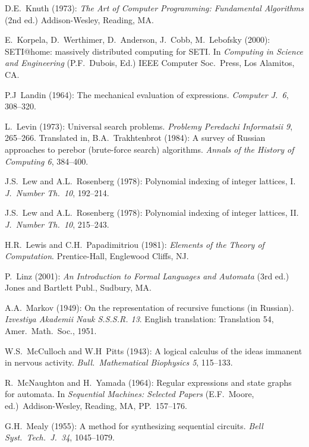\begin{thebibliography}{999}
D.E.~Knuth (1973): {\it The Art of Computer Programming: Fundamental
Algorithms} (2nd ed.)  Addison-Wesley, Reading, MA.

E.~Korpela, D.~Werthimer, D.~Anderson, J.~Cobb, M.~Lebofsky (2000):
SETI@home: massively distributed computing for SETI.  In {\it
Computing in Science and Engineering} (P.F.~Dubois, Ed.)  IEEE
Computer Soc.~Press, Los Alamitos, CA.


P.J~Landin (1964): The mechanical evaluation of expressions.  {\it
  Computer J.~6}, 308--320.

L.~Levin (1973): Universal search problems.  {\it Problemy Peredachi
Informatsii 9}, 265--266.  Translated in, B.A.~Trakhtenbrot (1984): A
survey of Russian approaches to perebor (brute-force search)
algorithms.  {\it Annals of the History of Computing 6}, 384--400.

J.S.~Lew and A.L.~Rosenberg (1978): Polynomial indexing of integer
lattices, I.  {\it J.~Number Th.~10}, 192--214.
 
J.S.~Lew and A.L.~Rosenberg (1978): Polynomial indexing of integer
lattices, II.  {\it J.~Number Th.~10}, 215--243.

H.R.~Lewis and C.H.~Papadimitriou (1981):
{\it Elements of the Theory of Computation}.
Prentice-Hall, Englewood Cliffs, NJ.

P.~Linz (2001): {\it An Introduction to Formal Languages and Automata}
(3rd ed.)  Jones and Bartlett Publ., Sudbury, MA.


A.A.~Markov (1949): On the representation of recursive functions (in
Russian).  {\it Izvestiya Akademii Nauk S.S.S.R. 13}.  English
translation: Translation 54, Amer.~Math.~Soc., 1951.

W.S.~McCulloch and W.H~Pitts (1943): A logical calculus of the ideas
immanent in nervous activity.  {\it Bull.~Mathematical Biophysics 5},
115--133.

R.~McNaughton and H.~Yamada (1964): Regular expressions and state
graphs for automata.  In {\it Sequential Machines: Selected Papers}
(E.F.~Moore, ed.)~Addison-Wesley, Reading, MA, PP.~157--176.

G.H.~Mealy (1955): A method for synthesizing sequential circuits.
{\it Bell Syst.~Tech.~J.~34}, 1045--1079.


\end{thebibliography}
